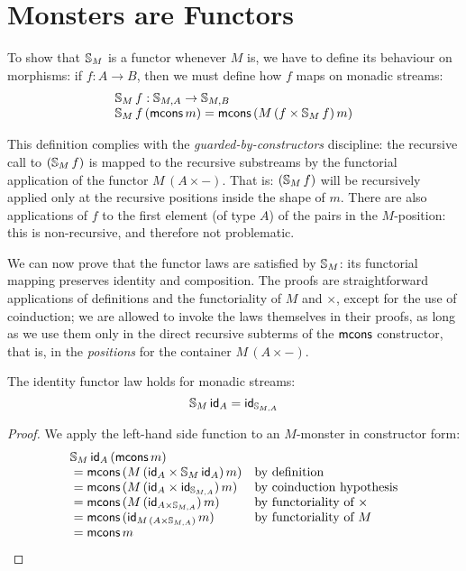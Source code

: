\section{Monsters are Functors}

To show that $\mathbb{S}_{M}$ is a functor whenever $M$ is, we have to define its behaviour on morphisms: if $f:A\rightarrow B$, then we must define how $f$ maps on monadic streams:
$$
\begin{array}{l}
\mathbb{S}_{M}\,f : \mathbb{S}_{M,A} \rightarrow \mathbb{S}_{M,B}\\
\mathbb{S}_{M}\,f\,(\mathsf{mcons}\,m) = \mathsf{mcons}\,(M\,(f\times \mathbb{S}_{M}\,f)\,m)
\end{array}
$$

This definition complies with the {\em guarded-by-constructors} discipline: the recursive call to $(\mathbb{S}_{M}\,f)$ is mapped to the recursive substreams by the functorial application of the functor $M\,(A \times -)$.
That is: $(\mathbb{S}_{M}\,f)$ will be recursively applied only at the recursive positions inside the shape of $m$.
There are also applications of $f$ to the first element (of type $A$) of the pairs in the $M$-position: this is non-recursive, and therefore not problematic.


We can now prove that the functor laws are satisfied by $\mathbb{S}_{M}$: its functorial mapping preserves identity and composition.
The proofs are straightforward applications of definitions and the functoriality of $M$ and $\times$, except for the use of coinduction;
we are allowed to invoke the laws themselves in their proofs, as long as we use them only in the direct recursive subterms of the $\mathsf{mcons}$ constructor, that is, in the {\em positions} for the container $M\,(A\times -)$.

\begin{lemma}\label{lemma:functor_id}
The identity functor law holds for monadic streams:
$$
\mathbb{S}_{M}\,\mathsf{id}_A = \mathsf{id}_{\mathbb{S}_{M,A}}
$$
\end{lemma}
\begin{proof}
We apply the left-hand side function to an $M$-monster in constructor form:
$$
\begin{array}{ll}
\mathbb{S}_{M}\,\mathsf{id}_A\,(\mathsf{mcons}\,m)\\
{}= \mathsf{mcons}\,(M\,(\mathsf{id}_A\times \mathbb{S}_{M}\,\mathsf{id}_A)\,m)
  & \mbox{by definition}\\
{}= \mathsf{mcons}\,(M\,(\mathsf{id}_A\times \mathsf{id}_{\mathbb{S}_{M,A}})\,m)
  & \mbox{by coinduction hypothesis}\\
{}= \mathsf{mcons}\,(M\,(\mathsf{id}_{A\times \mathbb{S}_{M,A}})\,m)
  & \mbox{by functoriality of }\times\\
{}= \mathsf{mcons}\,(\mathsf{id}_{M\,(A\times \mathbb{S}_{M,A})}\,m)
  & \mbox{by functoriality of }M\\
{}= \mathsf{mcons}\,m
\end{array}
$$
\end{proof}

